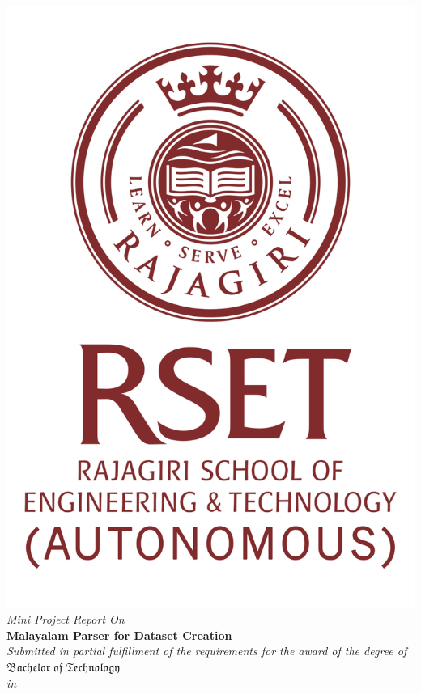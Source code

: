 \documentclass[12pt,a4paper,titlepage]{report}
\begin{document}
	\titlepage
	\thispagestyle{empty}
	\begin{center}
		\includegraphics[scale=0.3]{rset.png}\\[0.5cm]
		\large \textit{Mini Project Report On}\\[0.6cm]
		\Large \textbf{Malayalam Parser for Dataset Creation }\\[0.6cm]
		\textit{Submitted in partial fulfillment of the
			requirements for the award of the degree of}\\[0.6cm]
		{\huge {$\mathfrak {Bachelor\; of\; Technology}$}}\\[.2cm]
		\textit{in}\\[.2cm]

\end{center}
\end{document}
